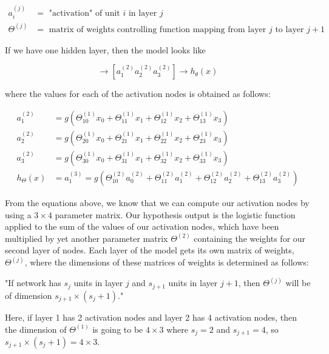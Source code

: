     \begin{align*}
        a_i^{(j)}       &= \text{ "activation" of unit $i$ in layer $j$} \\
        \Theta^{(j)}    &= \text{ matrix of weights controlling function mapping from layer $j$ to layer
        $j+1$}
    \end{align*}

    \noindent If we have one hidden layer, then the model looks like

    \begin{equation*}
    [x_0 x_1 x_2 x_3]
        \to \left[a_1^{(2)} a_2^{(2)} a_3^{(2)}\right] \to h_{\theta}(x)
    \end{equation*}

    \noindent where the values for each of the activation nodes is obtained as follows:

    \begin{align*}
        a_1^{(2)}   &= g(\Theta_{10}^{(1)}x_0 + \Theta_{11}^{(1)}x_1 + \Theta_{12}^{(1)}x_2 +
        \Theta_{13}^{(1)}x_3) \\
        a_2^{(2)}   &= g(\Theta_{20}^{(1)}x_0 + \Theta_{21}^{(1)}x_1 + \Theta_{22}^{(1)}x_2 +
        \Theta_{23}^{(1)}x_3) \\
        a_3^{(2)}   &= g(\Theta_{30}^{(1)}x_0 + \Theta_{31}^{(1)}x_1 + \Theta_{32}^{(1)}x_2 +
        \Theta_{33}^{(1)}x_3) \\
        h_\Theta(x) &= a_1^{(3)} = g(\Theta_{10}^{(2)}a_0^{(2)} + \Theta_{11}^{(2)}a_1^{(2)} +
        \Theta_{12}^{(2)}a_2^{(2)} + \Theta_{13}^{(2)}a_3^{(2)})
    \end{align*}

    \noindent From the equations above, we know that we can compute our activation nodes by using a
    $3\times 4$ parameter matrix. Our hypothesis output is the logistic function applied to the sum of the
    values of our activation nodes, which have been multiplied by yet another parameter matrix $\Theta^{(2)}$
    containing the weights for our second layer of nodes. Each layer of the model gets its own matrix of
    weights, $\Theta^{(j)}$, where the dimensions of these matrices of weights is determined as follows:

    \begin{center}
        "If network has $s_j$ units in layer $j$ and $s_{j+1}$ units in layer $j+1$, then $\Theta^{(j)}$
        will be of dimension $s_{j+1}\times (s_j + 1)$."
    \end{center}

    \noindent Here, if layer 1 has 2 activation nodes and layer 2 has 4 activation nodes, then the dimension of
    $\Theta^{(1)}$ is going to be $4\times 3$ where $s_j=2$ and $s_{j+1}=4$, so $s_{j+1}\times(s_j+1)=
    4\times 3$. \\

